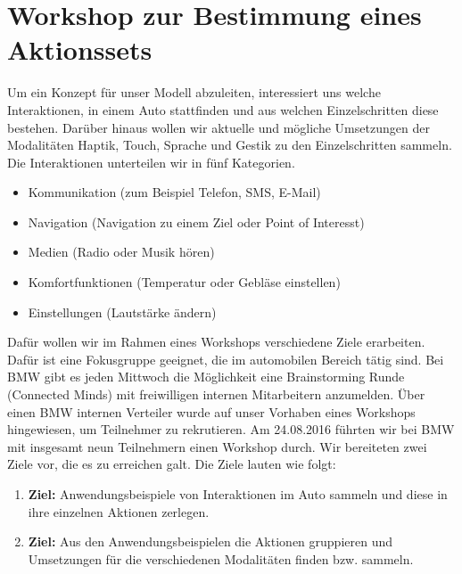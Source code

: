 \chapter[Workshop Connected Minds]{Workshop zur Bestimmung eines Aktionssets}\label{cha:Workshop}
Um ein Konzept für unser Modell abzuleiten, interessiert uns welche Interaktionen, in einem Auto stattfinden und aus welchen Einzelschritten diese bestehen. Darüber hinaus wollen wir aktuelle und mögliche Umsetzungen der Modalitäten Haptik, Touch, Sprache und Gestik zu den Einzelschritten sammeln. Die Interaktionen unterteilen wir in fünf Kategorien. 
\begin{itemize}
	\item Kommunikation (zum Beispiel Telefon, SMS, E-Mail)
	\item Navigation (Navigation zu einem Ziel oder Point of Interesst)
	\item Medien (Radio oder Musik hören)
	\item Komfortfunktionen (Temperatur oder Gebläse einstellen)
	\item Einstellungen (Lautstärke ändern)
\end{itemize}
Dafür wollen wir im Rahmen eines Workshops verschiedene Ziele erarbeiten. Dafür ist eine Fokusgruppe geeignet, die im automobilen Bereich tätig sind.   
Bei BMW gibt es jeden Mittwoch die Möglichkeit eine Brainstorming Runde (Connected Minds) mit freiwilligen internen Mitarbeitern anzumelden. 
Über einen BMW internen Verteiler wurde auf unser Vorhaben eines Workshops hingewiesen, um Teilnehmer zu rekrutieren. 
Am 24.08.2016 führten wir bei BMW mit insgesamt neun Teilnehmern einen Workshop durch. 
Wir bereiteten zwei Ziele vor, die es zu erreichen galt. Die Ziele lauten wie folgt:  
\begin{enumerate}
	\item \textbf{Ziel:} Anwendungsbeispiele von Interaktionen im Auto sammeln und diese in ihre einzelnen Aktionen zerlegen. 
	\item \textbf{Ziel:} Aus den Anwendungsbeispielen die Aktionen gruppieren und Umsetzungen für die verschiedenen Modalitäten finden bzw. sammeln.
\end{enumerate}
